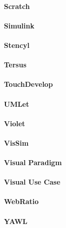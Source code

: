 \paragraph{Scratch}
\paragraph{Simulink}
\paragraph{Stencyl}
\paragraph{Tersus}
\paragraph{TouchDevelop}
\paragraph{UMLet}
\paragraph{Violet}
\paragraph{VisSim}
\paragraph{Visual Paradigm}
\paragraph{Visual Use Case}
\paragraph{WebRatio}
\paragraph{YAWL}

